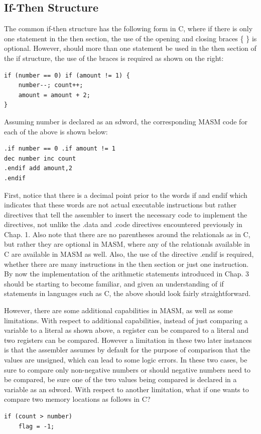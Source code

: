 \documentclass[10pt]{book}
\begin{document}
\subsection{If-Then Structure}
The common if-then structure has the following form in C, where if there is only one statement in the then section, the use of the opening and closing braces \{ \} is optional. However, should more than one statement be used in the then section of the if structure, the use of the braces is required as shown on the right:

\begin{verbatim}
if (number == 0) if (amount != 1) {
    number--; count++;
    amount = amount + 2;
}
\end{verbatim}

Assuming number is declared as an sdword, the corresponding MASM code for each of the above is shown below:

\begin{verbatim}
.if number == 0 .if amount != 1
dec number inc count
.endif add amount,2
.endif
\end{verbatim}

First, notice that there is a decimal point prior to the words if and endif which indicates that these words are not actual executable instructions but rather directives that tell the assembler to insert the necessary code to implement the directives, not unlike the .data and .code directives encountered previously in Chap. 1. Also note that there are no parentheses around the relationals as in C, but rather they are optional in MASM, where any of the relationals available in C are available in MASM as well. Also, the use of the directive .endif is required, whether there are many instructions in the then section or just one instruction. By now the implementation of the arithmetic statements introduced in Chap. 3 should be starting to become familiar, and given an understanding of if statements in languages such as C, the above should look fairly straightforward.

However, there are some additional capabilities in MASM, as well as some limitations. With respect to additional capabilities, instead of just comparing a variable to a literal as shown above, a register can be compared to a literal and two registers can be
compared. However a limitation in these two later instances is that the assembler assumes by default for the purpose of comparison that the values are unsigned, which can lead to some logic errors. In these two cases, be sure to compare only non-negative numbers or should negative numbers need to be compared, be sure one of the two values being compared is declared in a variable as an sdword. With respect to another limitation, what if one wants to compare two memory locations as follows in C?
\begin{verbatim}
if (count > number)
    flag = -1;
\end{verbatim}
\end{document}
